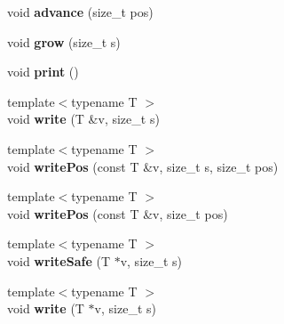 \begin{DoxyCompactItemize}
\item 
\hypertarget{classfaster_1_1fastCommBuffer_a55e2caa24b50fb9ff6619f3dd01c644a}{}void {\bfseries advance} (size\+\_\+t pos)\label{classfaster_1_1fastCommBuffer_a55e2caa24b50fb9ff6619f3dd01c644a}

\item 
\hypertarget{classfaster_1_1fastCommBuffer_a74eaeefb17821823451fcfc2238c6f95}{}void {\bfseries grow} (size\+\_\+t s)\label{classfaster_1_1fastCommBuffer_a74eaeefb17821823451fcfc2238c6f95}

\item 
\hypertarget{classfaster_1_1fastCommBuffer_a4dd1d988cd575cb815721b9acc3c30c3}{}void {\bfseries print} ()\label{classfaster_1_1fastCommBuffer_a4dd1d988cd575cb815721b9acc3c30c3}

\item 
\hypertarget{classfaster_1_1fastCommBuffer_a3b38d4b6332e864c9f7285961207a8dc}{}{\footnotesize template$<$typename T $>$ }\\void {\bfseries write} (T \&v, size\+\_\+t s)\label{classfaster_1_1fastCommBuffer_a3b38d4b6332e864c9f7285961207a8dc}

\item 
\hypertarget{classfaster_1_1fastCommBuffer_a4dc3d8c99ff08b1314fc36c77905dcbf}{}{\footnotesize template$<$typename T $>$ }\\void {\bfseries write\+Pos} (const T \&v, size\+\_\+t s, size\+\_\+t pos)\label{classfaster_1_1fastCommBuffer_a4dc3d8c99ff08b1314fc36c77905dcbf}

\item 
\hypertarget{classfaster_1_1fastCommBuffer_addda5fa378a3dfbb4ca1b14405b31c67}{}{\footnotesize template$<$typename T $>$ }\\void {\bfseries write\+Pos} (const T \&v, size\+\_\+t pos)\label{classfaster_1_1fastCommBuffer_addda5fa378a3dfbb4ca1b14405b31c67}

\item 
\hypertarget{classfaster_1_1fastCommBuffer_ac47c799234667ff23f5b5ddd699f2ed2}{}{\footnotesize template$<$typename T $>$ }\\void {\bfseries write\+Safe} (T $\ast$v, size\+\_\+t s)\label{classfaster_1_1fastCommBuffer_ac47c799234667ff23f5b5ddd699f2ed2}

\item 
\hypertarget{classfaster_1_1fastCommBuffer_a29d46f8bf3c72be5c52d27af129392c5}{}{\footnotesize template$<$typename T $>$ }\\void {\bfseries write} (T $\ast$v, size\+\_\+t s)\label{classfaster_1_1fastCommBuffer_a29d46f8bf3c72be5c52d27af129392c5}


\end{DoxyCompactItemize}
